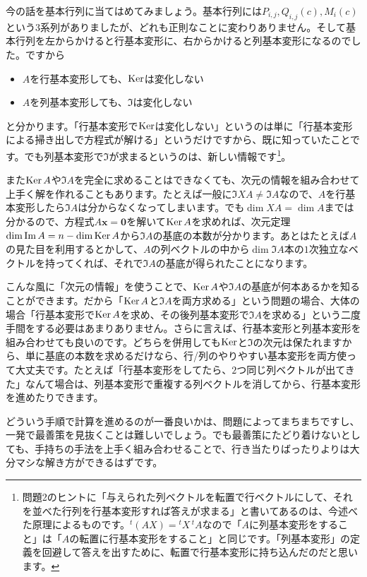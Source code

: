 今の話を基本行列に当てはめてみましょう。基本行列には$P_{i, j}, Q_{i, j}(c), M_i(c)$という$3$系列がありましたが、どれも正則なことに変わりありません。そして基本行列を左からかけると行基本変形に、右からかけると列基本変形になるのでした。ですから
\begin{itemize}
\item $A$を行基本変形しても、$\operatorname{Ker}$は変化しない
\item $A$を列基本変形しても、$\Im$は変化しない
\end{itemize}
と分かります。「行基本変形で$\operatorname{Ker}$は変化しない」というのは単に「行基本変形による掃き出しで方程式が解ける」というだけですから、既に知っていたことです。でも列基本変形で$\Im$が求まるというのは、新しい情報です\footnote{問題2のヒントに「与えられた列ベクトルを転置で行ベクトルにして、それを並べた行列を行基本変形すれば答えが求まる」と書いてあるのは、今述べた原理によるものです。${}^t(AX) = {}^t\! X\, {}^t\! A$なので「$A$に列基本変形をすること」は「$A$の転置に行基本変形をすること」と同じです。「列基本変形」の定義を回避して答えを出すために、転置で行基本変形に持ち込んだのだと思います。}。

また$\operatorname{Ker} A$や$\Im A$を完全に求めることはできなくても、次元の情報を組み合わせて上手く解を作れることもあります。たとえば一般に$\Im XA \neq \Im A$なので、$A$を行基本変形したら$\Im A$は分からなくなってしまいます。でも$\dim XA = \dim A$までは分かるので、方程式$A\bm{x} = \bm{0}$を解いて$\operatorname{Ker} A$を求めれば、次元定理$\dim \mathrm{Im}\, A = n - \dim \operatorname{Ker} A$から$\Im A$の基底の本数が分かります。あとはたとえば$A$の見た目を利用するとかして、$A$の列ベクトルの中から$\dim \Im A$本の$1$次独立なベクトルを持ってくれば、それで$\Im A$の基底が得られたことになります。

こんな風に「次元の情報」を使うことで、$\operatorname{Ker} A$や$\Im A$の基底が何本あるかを知ることができます。だから「$\operatorname{Ker} A$と$\Im A$を両方求める」という問題の場合、大体の場合「行基本変形で$\operatorname{Ker} A$を求め、その後列基本変形で$\Im A$を求める」という二度手間をする必要はあまりありません。さらに言えば、行基本変形と列基本変形を組み合わせても良いのです。どちらを併用しても$\operatorname{Ker}$と$\Im$の次元は保たれますから、単に基底の本数を求めるだけなら、行/列のやりやすい基本変形を両方使って大丈夫です。たとえば「行基本変形をしてたら、$2$つ同じ列ベクトルが出てきた」なんて場合は、列基本変形で重複する列ベクトルを消してから、行基本変形を進めたりできます。

どういう手順で計算を進めるのが一番良いかは、問題によってまちまちですし、一発で最善策を見抜くことは難しいでしょう。でも最善策にたどり着けないとしても、手持ちの手法を上手く組み合わせることで、行き当たりばったりよりは大分マシな解き方ができるはずです。

